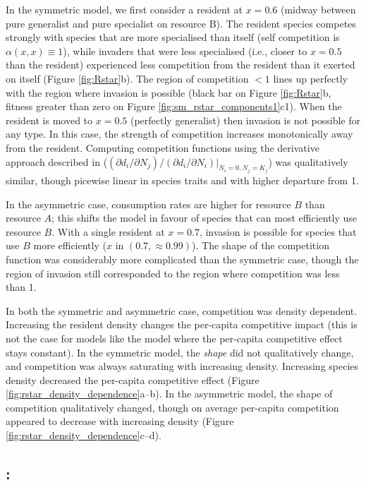 \documentclass[a4paper,11pt]{article}
\begin{document}
In the symmetric model, we first consider a resident at $x = 0.6$
(midway between pure generalist and pure specialist on resource B).
%
The resident species competes strongly with species that are more
specialised than itself (self competition is $\alpha(x, x) \equiv
1$), while invaders that were less specialised (i.e., closer to $x =
0.5$ than the resident) experienced less competition from the resident
than it exerted on itself (Figure \ref{fig:Rstar}b).
%
The region of competition $< 1$ lines up perfectly with the region
where invasion is possible (black bar on Figure \ref{fig:Rstar}b,
fitness greater than zero on Figure
\ref{fig:sm_rstar_components1}c1).
%
When the resident is moved to $x = 0.5$ (perfectly generalist) then
invasion is not possible for any type.  In this case, the strength of
competition increases monotonically away from the resident.
%
Computing competition functions using the derivative approach
described in \citet{Abrams-2008}
($(\partial d_i / \partial N_j) / (\partial d_i / \partial N_i) |_{N_i
  = 0, N_j = K_j}$)
was qualitatively similar, though picewise linear in species traits
and with higher departure from 1.

In the asymmetric case, consumption rates are higher for
resource $B$ than resource $A$; this shifts the model in favour of
species that can most efficiently use resource $B$.
%
With a single resident at $x = 0.7$, invasion is possible for species
that use $B$ more efficiently ($x$ in $(0.7, \approx 0.99)$).
%
The shape of the competition function was considerably more
complicated than the symmetric case, though the region of invasion
still corresponded to the region where competition was less than 1.

In both the symmetric and asymmetric case, competition was density
dependent.  Increasing the resident density changes the per-capita
competitive impact (this is not the case for models like the
\citet{Dieckmann-1999} model where the per-capita competitive effect
stays constant).
%
In the symmetric model, the \emph{shape} did not qualitatively change,
and competition was always saturating with increasing density.
Increasing species density decreased the per-capita competitive effect
(Figure \ref{fig:rstar_density_dependence}a--b).
%
In the asymmetric model, the shape of competition qualitatively
changed, though on average per-capita competition appeared to decrease
with increasing density (Figure
\ref{fig:rstar_density_dependence}c--d).

\subsection{\plant: \hmat}
\end{document}
